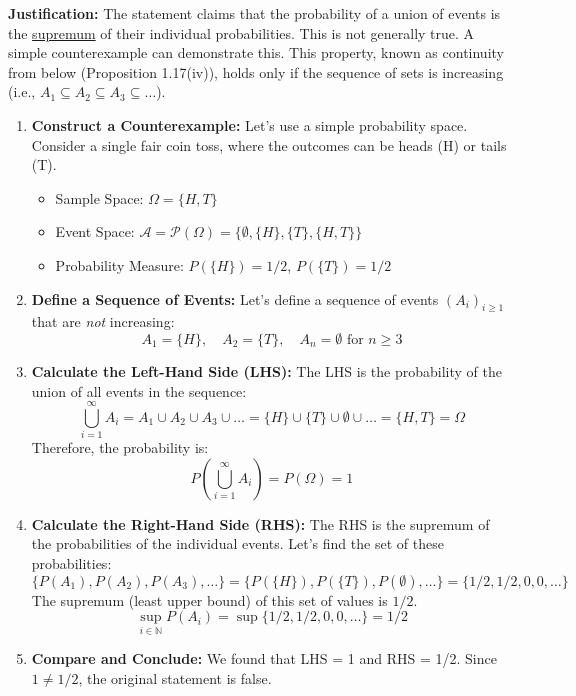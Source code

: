 \documentclass[11pt,a4paper]{article}
\begin{document}
\textbf{Justification:}
The statement claims that the probability of a union of events is the \hyperlink{note5}{supremum} of their individual probabilities. This is not generally true. A simple counterexample can demonstrate this. This property, known as continuity from below (Proposition 1.17(iv)), holds only if the sequence of sets is increasing (i.e., $A_1 \subseteq A_2 \subseteq A_3 \subseteq \dots$).

\begin{enumerate}
    \item \textbf{Construct a Counterexample:} Let's use a simple probability space. Consider a single fair coin toss, where the outcomes can be heads (H) or tails (T).
    \begin{itemize}
        \item Sample Space: $\Omega = \{H, T\}$
        \item Event Space: $\mathcal{A} = \mathcal{P}(\Omega) = \{\emptyset, \{H\}, \{T\}, \{H, T\}\}$
        \item Probability Measure: $P(\{H\}) = 1/2$, $P(\{T\}) = 1/2$
    \end{itemize}

    \item \textbf{Define a Sequence of Events:} Let's define a sequence of events $(A_i)_{i \ge 1}$ that are \emph{not} increasing:
    \[
        A_1 = \{H\}, \quad A_2 = \{T\}, \quad A_n = \emptyset \text{ for } n \ge 3
    \]

    \item \textbf{Calculate the Left-Hand Side (LHS):}
    The LHS is the probability of the union of all events in the sequence:
    \[
        \bigcup_{i=1}^{\infty} A_i = A_1 \cup A_2 \cup A_3 \cup \dots = \{H\} \cup \{T\} \cup \emptyset \cup \dots = \{H, T\} = \Omega
    \]
    Therefore, the probability is:
    \[
        P\left(\bigcup_{i=1}^{\infty} A_i\right) = P(\Omega) = 1
    \]

    \item \textbf{Calculate the Right-Hand Side (RHS):}
    The RHS is the supremum of the probabilities of the individual events. Let's find the set of these probabilities:
    \[
        \{P(A_1), P(A_2), P(A_3), \dots \} = \{P(\{H\}), P(\{T\}), P(\emptyset), \dots \} = \{1/2, 1/2, 0, 0, \dots\}
    \]
    The supremum (least upper bound) of this set of values is $1/2$.
    \[
        \sup_{i \in \mathbb{N}} P(A_i) = \sup\{1/2, 1/2, 0, 0, \dots\} = 1/2
    \]

    \item \textbf{Compare and Conclude:} We found that LHS = 1 and RHS = 1/2. Since $1 \neq 1/2$, the original statement is false.
\end{enumerate}
\end{document}

